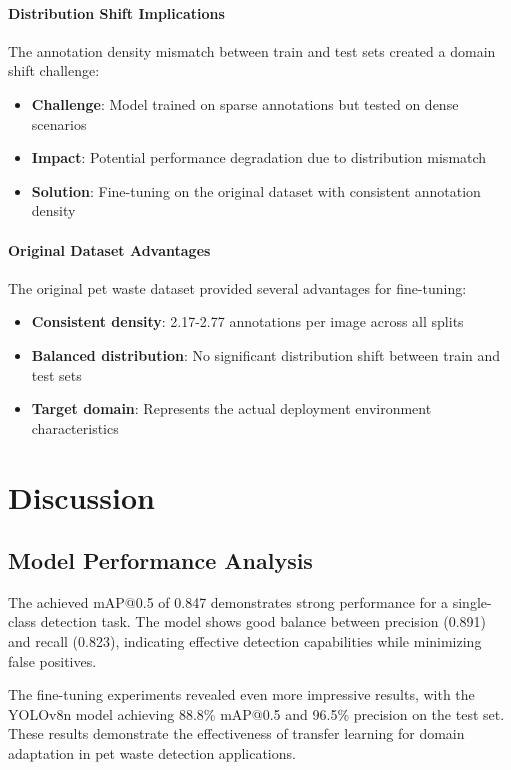 \documentclass[12pt,a4paper]{article}
\begin{document}
\paragraph{Distribution Shift Implications}
The annotation density mismatch between train and test sets created a domain shift challenge:
\begin{itemize}
    \item \textbf{Challenge}: Model trained on sparse annotations but tested on dense scenarios
    \item \textbf{Impact}: Potential performance degradation due to distribution mismatch
    \item \textbf{Solution}: Fine-tuning on the original dataset with consistent annotation density
\end{itemize}

\paragraph{Original Dataset Advantages}
The original pet waste dataset provided several advantages for fine-tuning:
\begin{itemize}
    \item \textbf{Consistent density}: 2.17-2.77 annotations per image across all splits
    \item \textbf{Balanced distribution}: No significant distribution shift between train and test sets
    \item \textbf{Target domain}: Represents the actual deployment environment characteristics
\end{itemize}

\section{Discussion}

\subsection{Model Performance Analysis}

The achieved mAP@0.5 of 0.847 demonstrates strong performance for a single-class detection task. The model shows good balance between precision (0.891) and recall (0.823), indicating effective detection capabilities while minimizing false positives.

The fine-tuning experiments revealed even more impressive results, with the YOLOv8n model achieving 88.8\% mAP@0.5 and 96.5\% precision on the test set. These results demonstrate the effectiveness of transfer learning for domain adaptation in pet waste detection applications.
\end{document}

